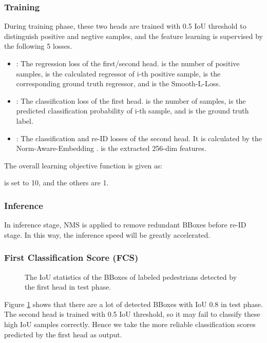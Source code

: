 \documentclass[letterpaper]{article} \usepackage{aaai21}  \usepackage{times}  \usepackage{helvet} \usepackage{courier}  \usepackage[hyphens]{url}  \usepackage{graphicx} \urlstyle{rm} \def\UrlFont{\rm}  \usepackage{natbib}  \usepackage{caption} \usepackage{multirow}
\begin{document}
\subsubsection{Training}
During training phase, these two heads are trained with 0.5 IoU threshold to distinguish positive and negtive samples, and the feature learning is supervised by the following 5 losses.
\begin{itemize}
    \item : The regression loss of the first/second head.  is the number of positive samples,  is the calculated regressor of i-th positive sample,  is the corresponding ground truth regressor, and  is the Smooth-L-Loss.
          
    \item : The classification loss of the first head.  is the number of samples,  is the predicted classification probability of i-th sample, and  is the ground truth label.
          
    \item : The classification and re-ID losses of the second head. It is calculated by the Norm-Aware-Embedding .  is the extracted 256-dim features.
          
\end{itemize}

The overall learning objective function is given as:


 is set to 10, and the others are 1.

\subsubsection{Inference}
In inference stage, NMS is applied to remove redundant BBoxes before re-ID stage. In this way, the inference speed will be greatly accelerated.

\subsubsection{First Classification Score (FCS)}
\begin{figure}[t]
    \centering
    \resizebox{0.7\columnwidth}{!}
    {
    }
    \caption{The IoU statistics of the BBoxes of labeled pedestrians detected by the first head in test phase.}
    \label{iou_statistics}
\end{figure}
Figure \ref{iou_statistics} shows that there are a lot of detected BBoxes with IoU  0.8 in test phase. The second head is trained with 0.5 IoU threshold, so it may fail to classify these high IoU samples correctly. Hence we take the more reliable classification scores predicted by the first head as output.
\end{document}
